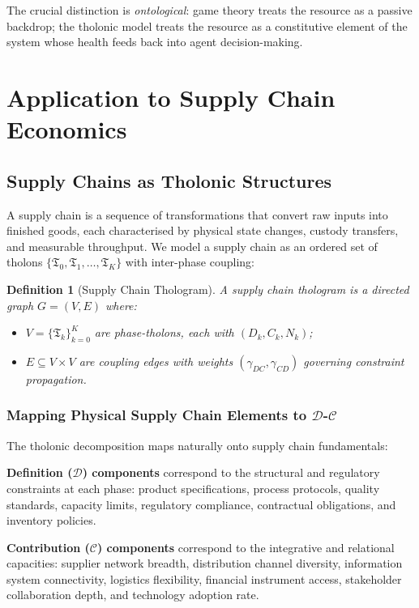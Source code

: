\documentclass[12pt,a4paper,twocolumn]{article}
\newtheorem{definition}{Definition}[section]
\newcommand{\D}{\mathcal{D}}
\newcommand{\CC}{\mathcal{C}}
\newcommand{\tholon}{\mathfrak{T}}
\begin{document}
The crucial distinction is \emph{ontological}: game theory treats the resource as a passive backdrop; the tholonic model treats the resource as a constitutive element of the system whose health feeds back into agent decision-making.

\section{Application to Supply Chain Economics}
\label{sec:supplychain}

\subsection{Supply Chains as Tholonic Structures}

A supply chain is a sequence of transformations that convert raw inputs into finished goods, each characterised by physical state changes, custody transfers, and measurable throughput.
We model a supply chain as an ordered set of tholons $\{\tholon_0, \tholon_1, \ldots, \tholon_K\}$ with inter-phase coupling:

\begin{definition}[Supply Chain Thologram]
A \emph{supply chain thologram} is a directed graph $G = (V, E)$ where:
\begin{itemize}[nosep]
  \item $V = \{\tholon_k\}_{k=0}^K$ are phase-tholons, each with $(D_k, C_k, N_k)$;
  \item $E \subseteq V \times V$ are coupling edges with weights $(\gamma_{DC}, \gamma_{CD})$ governing constraint propagation.
\end{itemize}
\end{definition}

\subsubsection{Mapping Physical Supply Chain Elements to $\D$-$\CC$}

The tholonic decomposition maps naturally onto supply chain fundamentals:

\textbf{Definition ($\D$) components} correspond to the structural and regulatory constraints at each phase: product specifications, process protocols, quality standards, capacity limits, regulatory compliance, contractual obligations, and inventory policies.

\textbf{Contribution ($\CC$) components} correspond to the integrative and relational capacities: supplier network breadth, distribution channel diversity, information system connectivity, logistics flexibility, financial instrument access, stakeholder collaboration depth, and technology adoption rate.
\end{document}

